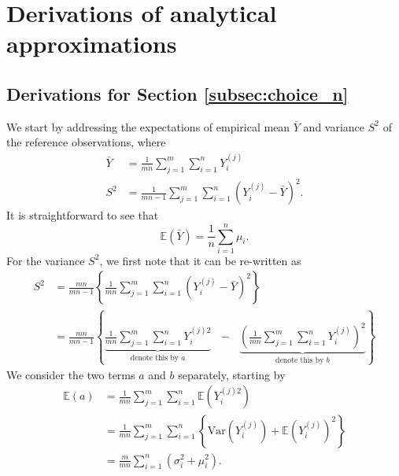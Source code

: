 \documentclass{article}
\newcommand{\sd}{s}
\begin{document}
{\footnotesize


}

\appendix

\section{Derivations of analytical approximations}
\label{appendix:derivations}

\subsection{Derivations for Section \ref{subsec:choice_n}}
\label{appendix:derivation_n}

We start by addressing the expectations of empirical mean $\bar{Y}$ and variance $S^2$ of the reference observations, where
\begin{align*}
\bar{Y} & = \frac{1}{mn} \sum_{j = 1}^m \sum_{i = 1}^n Y_i^{(j)}\\
S^2 & = \frac{1}{mn - 1} \sum_{j = 1}^m \sum_{i = 1}^n \left(Y_i^{(j)} - \bar{Y}\right)^2.
\end{align*}
It is straightforward to see that 
\begin{equation}
\mathbb{E}(\bar{Y}) = \frac{1}{n} \sum_{i = 1}^n \mu_i.
\end{equation}
For the variance $S^2$, we first note that it can be re-written as
\begin{align}
S^2 & = \frac{mn}{mn - 1} \left\{\frac{1}{mn} \sum_{j = 1}^m \sum_{i = 1}^n \left(Y_i^{(j)} - \bar{Y}\right)^2 \right\}\\
& = \frac{mn}{mn - 1} \left\{ \underbrace{\frac{1}{mn} \sum_{j = 1}^m \sum_{i = 1}^n Y_i^{(j)2}}_{\text{denote this by } a} \ \ \ - \ \ \ \underbrace{\left(\frac{1}{mn} \sum_{j = 1}^m \sum_{i = 1}^n Y_i^{(j)} \right)^2}_{\text{denote this by } b} \right\} \label{eq:sigma2hat}
\end{align}
We consider the two terms $a$ and $b$ separately, starting by
\begin{align*}
\mathbb{E}(a) & = \frac{1}{mn} \sum_{j = 1}^m \sum_{i = 1}^n \mathbb{E}\left(Y_i^{(j)2}\right)\\
& = \frac{1}{mn} \sum_{j = 1}^m \sum_{i = 1}^n \left\{ \text{Var}\left(Y_i^{(j)}\right) + \mathbb{E}\left(Y_i^{(j)}\right)^2 \right\}\\
& = \frac{m}{mn} \sum_{i = 1}^n (\sigma_{i}^2 + \mu_i^2).
\end{align*}
\end{document}
